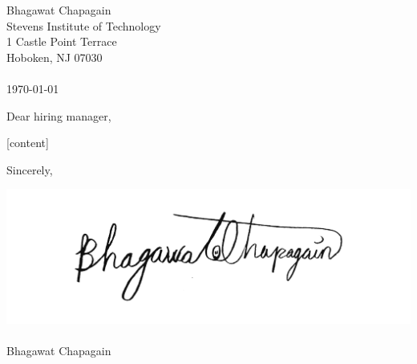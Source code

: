 \documentclass[12pt]{ministate}
\begin{document}
\runninghead

\thispagestyle{fancy}

Bhagawat Chapagain\\
Stevens Institute of Technology\\
1 Castle Point Terrace\\
Hoboken, NJ 07030\\\\
\today

Dear hiring manager, 

[content]

Sincerely,

\includegraphics[scale=.1]{signature.png}\\\\
Bhagawat Chapagain\\




\end{document}
